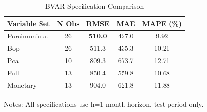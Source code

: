 \begin{table}[htbp]
\centering
\small
\caption{BVAR Specification Comparison}
\label{tab:bvar_specs}
\begin{tabular}{lcccc}
\toprule
Variable Set & N Obs & RMSE & MAE & MAPE (\%) \\
\midrule
Parsimonious & 26 & \textbf{510.0} & 427.0 & 9.92 \\
Bop & 26 & 511.3 & 435.3 & 10.21 \\
Pca & 10 & 809.3 & 673.7 & 12.71 \\
Full & 13 & 850.4 & 559.8 & 10.68 \\
Monetary & 13 & 904.0 & 621.8 & 11.88 \\
\bottomrule
\end{tabular}
\begin{tablenotes}
\small
\item Notes: All specifications use h=1 month horizon, test period only.
\end{tablenotes}
\end{table}